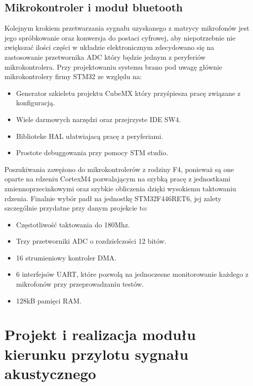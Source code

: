 \documentclass[eng,printmode]{mgr}
\begin{document}
\section{Mikrokontroler i moduł bluetooth}
Kolejnym krokiem przetwarzania sygnału uzyskanego z matrycy mikrofonów jest jego spróbkowanie oraz konwersja do postaci cyfrowej, aby niepotrzebnie nie zwiększać ilości części w układzie elektronicznym zdecydowano się na zastosowanie przetwornika ADC który będzie jednym z peryferiów mikrokontrolera. Przy projektowaniu systemu brano pod uwagę głównie mikrokontrolery firmy STM32 ze względu na:
\begin{itemize}
\item Generator szkieletu projektu CubeMX który przyśpiesza pracę związane z konfiguracją.
\item Wiele darmowych narzędzi oraz przejrzyste IDE SW4.
\item Biblioteke HAL ułatwiajacą pracę z peryferiami.
\item Prostote debuggowania przy pomocy STM studio.
\end{itemize} 
Poszukiwania zawężono do mikrokontrolerów z rodziny F4, ponieważ są one oparte na rdzeniu CortexM4 pozwalającym na szybką pracę z jednostkami zmiennoprzecinkowymi oraz szybkie obliczenia dzięki wysokiemu taktowaniu rdzenia. Finalnie wybór padł na jednostkę STM32F446RET6, jej zalety szczególnie przydatne przy danym projekcie to:
\begin{itemize}
\item Częstotliwość taktowania do 180Mhz.
\item Trzy przetworniki ADC o rozdzielczości 12 bitów.
\item 16 strumieniowy kontroler DMA.
\item 6 interfejsów UART, które pozwolą na jednoczesne monitorowanie każdego z mikrofonów przy przeprowadzaniu testów.
\item 128kB pamięci RAM.
\end{itemize} 
\chapter{Projekt i realizacja modułu
 kierunku przylotu sygnału akustycznego}
 
\end{document}
